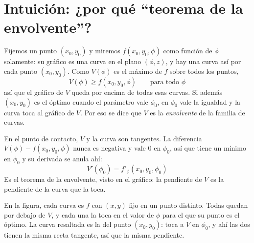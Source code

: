 \documentclass{article}
\begin{document}
\section*{Intuición: ¿por qué ``teorema de la envolvente''?}

Fijemos un punto \((x_0,y_0)\) y miremos \(f(x_0,y_0,\phi)\) como función de \(\phi\) solamente: su gráfico es una curva en el plano \((\phi,z)\), y hay una curva así por cada punto \((x_0,y_0)\). Como \(V(\phi)\) es el máximo de \(f\) sobre todos los puntos,
\[
V(\phi)\geq f(x_0,y_0,\phi)\qquad\text{para todo }\phi
\]
así que el gráfico de \(V\) queda por encima de todas esas curvas. Si además \((x_0,y_0)\) es el óptimo cuando el parámetro vale \(\phi_0\), en \(\phi_0\) vale la igualdad y la curva toca al gráfico de \(V\). Por eso se dice que \(V\) es la \emph{envolvente} de la familia de curvas.

En el punto de contacto, \(V\) y la curva son tangentes. La diferencia \(V(\phi)-f(x_0,y_0,\phi)\) nunca es negativa y vale \(0\) en \(\phi_0\), así que tiene un mínimo en \(\phi_0\) y su derivada se anula ahí:
\[
V'(\phi_0)=f'_\phi(x_0,y_0,\phi_0)
\]
Es el teorema de la envolvente, visto en el gráfico: la pendiente de \(V\) es la pendiente de la curva que la toca.

En la figura, cada curva es \(f\) con \((x,y)\) fijo en un punto distinto. Todas quedan por debajo de \(V\), y cada una la toca en el valor de \(\phi\) para el que su punto es el óptimo. La curva resaltada es la del punto \((x_0,y_0)\): toca a \(V\) en \(\phi_0\), y ahí las dos tienen la misma recta tangente, así que la misma pendiente.
\end{document}
